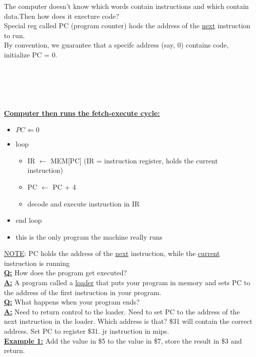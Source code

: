 \documentclass[12pt]{article}
\newcommand{\myt}[1]{\textbf{\underline{#1}}}
\begin{document}
	The computer doesn't know which words contain instructions and which contain data.Then how does it execture code?\\
	Special reg called PC (program counter) hods the address of the \underline{next} instruction to run.\\
	By convention, we guarantee that a specifc address (say, 0) contains code, initialize PC = 0.\\\\\\\\\\\\
	\myt{Computer then runs the fetch-execute cycle:}\\
	\begin{itemize}
		\item $PC \Leftarrow 0$
		\item loop
		\begin{itemize}
			\item IR $\leftarrow$ MEM[PC] (IR = instruction register, holds the current instruction)
			\item PC $\leftarrow$ PC + 4
			\item decode and execute instruction in IR
		\end{itemize}
		\item end loop
		\item this is the only program the machine really runs
	\end{itemize}
	
	\underline{NOTE}: PC holds the address of the \underline{next} instruction, while the \underline{current} instruction is running\\
	
	\myt{Q:} How does the program get executed?\\
	\myt{A:} A program called a \underline{loader} that puts your program in memory and sets PC to the address of the first instruction in your program.\\
	
	\myt{Q:} What happens when your program ends?\\
	\myt{A:} Need to return control to the loader. Need to set PC to the address of the next instruction in the loader. Which address is that? \$31 will contain the correct address. Set PC to register \$31. jr instruction in mips.\\
	
	\myt{Example 1:} Add the value in \$5 to the value in \$7, store the result in \$3 and return.\\
	
\end{document}

